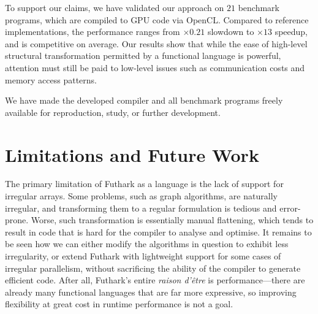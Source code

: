 To support our claims, we have validated our approach on $21$
benchmark programs, which are compiled to GPU code via
OpenCL. Compared to reference implementations, the performance ranges
from $\times0.21$ slowdown to $\times13$ speedup, and is competitive
on average.
%
Our results show that while the ease of high-level structural
transformation permitted by a functional language is powerful,
attention must still be paid to low-level issues such as communication
costs and memory access patterns.

We have made the developed compiler and all benchmark programs freely
available for reproduction, study, or further development.

\section{Limitations and Future Work}

The primary limitation of Futhark as a language is the lack of support
for irregular arrays.  Some problems, such as graph algorithms, are
naturally irregular, and transforming them to a regular formulation is
tedious and error-prone.  Worse, such transformation is essentially
manual flattening, which tends to result in code that is hard for the
compiler to analyse and optimise.  It remains to be seen how we can
either modify the algorithms in question to exhibit less irregularity,
or extend Futhark with lightweight support for some cases of irregular
parallelism, without sacrificing the ability of the compiler to
generate efficient code.  After all, Futhark's entire \textit{raison
  d'être} is performance---there are already many functional languages
that are far more expressive, so improving flexibility at great cost
in runtime performance is not a goal.

